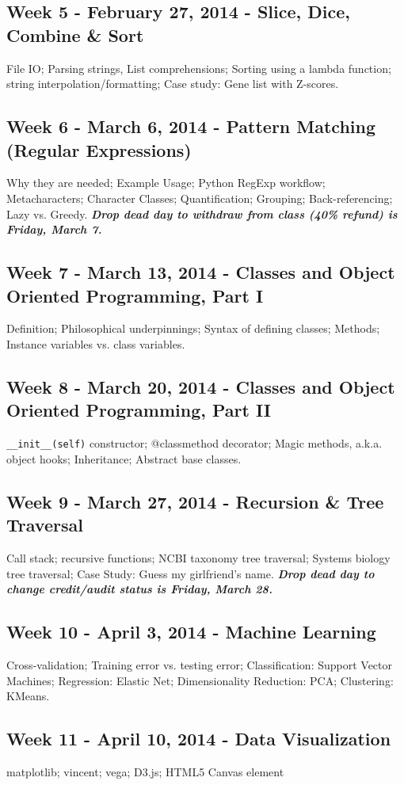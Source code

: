 \documentclass{article}
\begin{document}
\subsection*{Week 5 - February 27, 2014 - Slice, Dice, Combine \& Sort}
File IO; Parsing strings, List comprehensions; Sorting using a lambda function; string interpolation/formatting; Case study: Gene list with Z-scores.
\subsection*{Week 6 - March 6, 2014 - Pattern Matching (Regular Expressions)}
Why they are needed; Example Usage; Python RegExp workflow; Metacharacters; Character Classes; Quantification; Grouping; Back-referencing; Lazy vs. Greedy. \textbf{\textit{Drop dead day to withdraw from class (40\% refund) is Friday, March 7.}}
\subsection*{Week 7 - March 13, 2014 - Classes and Object Oriented Programming, Part I}
Definition; Philosophical underpinnings;  Syntax of defining classes;  Methods; Instance variables vs. class variables.
\subsection*{Week 8 - March 20, 2014 - Classes and Object Oriented Programming, Part II}
\verb|__init__(self)| constructor; @classmethod decorator; Magic methods, a.k.a. object hooks; Inheritance; Abstract base classes.
\subsection*{Week 9 - March 27, 2014 - Recursion \& Tree Traversal}
Call stack; recursive functions; NCBI taxonomy tree traversal; Systems biology tree traversal; Case Study: Guess my girlfriend's name. \textbf{\textit{Drop dead day to change credit/audit status is Friday, March 28.}}
\subsection*{Week 10 - April 3, 2014 - Machine Learning}
Cross-validation; Training error vs. testing error; Classification: Support Vector Machines; Regression: Elastic Net; Dimensionality Reduction: PCA; Clustering: KMeans.
\subsection*{Week 11 - April 10, 2014 - Data Visualization}
matplotlib; vincent; vega; D3.js; HTML5 Canvas element
\end{document}

